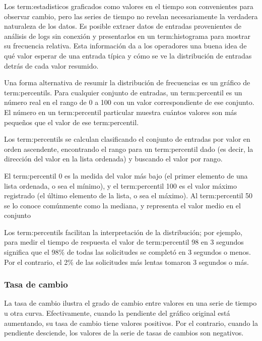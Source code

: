 Los \glspl{term:estadistico} graficados como valores en el tiempo son
convenientes para observar cambio, pero las series de tiempo no revelan
necesariamente la verdadera naturaleza de los datos. Es posible extraer datos
de entradas provenientes de análisis de logs sin conexión y presentarlos en un
\gls{term:histograma} para mostrar su frecuencia relativa. Esta información da
a los operadores una buena idea de qué valor esperar de una entrada típica y
cómo se ve la distribución de entradas detrás de cada valor resumido.

Una forma alternativa de resumir la distribución de frecuencias es un gráfico
de \glspl{term:percentil}. Para cualquier conjunto de entradas, un
\gls{term:percentil} es un número real en el rango de 0 a 100 con un valor
correspondiente de ese conjunto. El número en un \gls{term:percentil}
particular muestra cuántos valores son más pequeños que el valor de ese
\gls{term:percentil}.

Los \glspl{term:percentil} se calculan clasificando el conjunto de entradas por
valor en orden ascendente, encontrando el rango para un \gls{term:percentil}
dado (es decir, la dirección del valor en la lista ordenada) y buscando el
valor por rango.

El \gls{term:percentil} 0 es la medida del valor más bajo (el primer elemento
de una lista ordenada, o sea el mínimo), y el \gls{term:percentil} 100 es el
valor máximo registrado (el último elemento de la lista, o sea el máximo). Al
\gls{term:percentil} 50 se lo conoce comúnmente como la mediana, y representa
el valor medio en el conjunto

Los \glspl{term:percentil} facilitan la interpretación de la distribución; por
ejemplo, para medir el tiempo de respuesta el valor de \gls{term:percentil} 98
en 3 segundos significa que el 98\% de todas las solicitudes se completó en 3
segundos o menos. Por el contrario, el 2\% de las solicitudes más lentas
tomaron 3 segundos o más.

\subsubsection*{Tasa de cambio}
\label{tasa_de_cambio}

La tasa de cambio ilustra el grado de cambio entre valores en una serie de
tiempo u otra curva. Efectivamente, cuando la pendiente del gráfico original
está aumentando, su tasa de cambio tiene valores positivos. Por el contrario,
cuando la pendiente desciende, los valores de la serie de tasas de cambios son
negativos.

